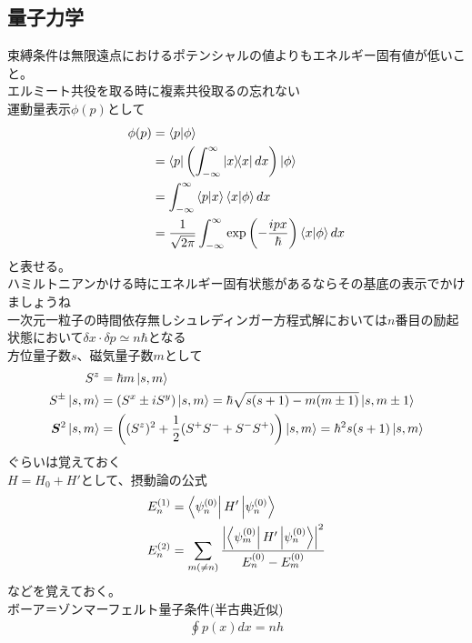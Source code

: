 \documentclass{ltjsarticle}
\begin{document}
  \subsection{量子力学}
  束縛条件は無限遠点におけるポテンシャルの値よりもエネルギー固有値が低いこと。\\
  エルミート共役を取る時に複素共役取るの忘れない\\
  運動量表示$\phi(p)$として
  \begin{align}
    \phi(p)
    &=\bra{p}\ket{\phi}\\
    &=\bra{p}\left( \int^\infty_{-\infty}\ketbra{x} dx \right) \ket{\phi}\\
    &=\int^\infty_{-\infty}\bra{p}\ket{x}\bra{x}\ket{\phi}dx\\
    &=\frac{1}{\sqrt{2\pi}}\int^\infty_{-\infty}\exp\left( -\frac{ipx}{\hbar} \right)\bra{x}\ket{\phi}dx\\
  \end{align}
  と表せる。\\
  ハミルトニアンかける時にエネルギー固有状態があるならその基底の表示でかけましょうね\\
  一次元一粒子の時間依存無しシュレディンガー方程式解においては$n$番目の励起状態において$\delta x\cdot \delta p\simeq n\hbar$となる\\
  方位量子数$s$、磁気量子数$m$として
  \begin{align}
    S^z&=\hbar m\ket{s,m}\\
    S^\pm\ket{s,m}&=(S^x\pm iS^y)\ket{s,m}=\hbar\sqrt{s(s+1)-m(m\pm 1)}\ket{s,m\pm 1}\\
    \bm{S}^2\ket{s,m}&=\left((S^z)^2+\frac{1}{2}(S^+S^-+S^-S^+)\right)\ket{s,m}=\hbar^2s(s+1)\ket{s,m}\\
  \end{align}
  ぐらいは覚えておく\\
  $H=H_0+H'$として、摂動論の公式
  \begin{align}
    E_n^{(1)}&=\bra{\psi_n^{(0)}}H' \ket{\psi_n^{(0)}}\\
    E_n^{(2)}&=\sum_{m(\neq n)}\frac{\abs{\bra{\psi_m^{(0)}}H' \ket{\psi_n^{(0)}}}^2}{E_n^{(0)}-E_m^{(0)}}
  \end{align}
  などを覚えておく。\\
  ボーア＝ゾンマーフェルト量子条件(半古典近似)
  \begin{align}
    \oint p(x)dx=nh
  \end{align}
\end{document}
